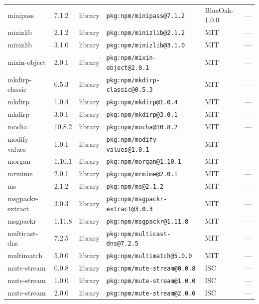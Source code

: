 \documentclass[11pt,a4paper]{article}
\begin{document}
\begin{longtable}{|p{4cm}|p{2cm}|p{1.6cm}|p{5cm}|p{1.5cm}|p{3.5cm}|}
\raggedright minipass & 7.1.2 & library & \small\texttt{pkg:npm/minipass@7.1.2} & BlueOak-1.0.0 & \small — \\
\raggedright minizlib & 2.1.2 & library & \small\texttt{pkg:npm/minizlib@2.1.2} & MIT & \small — \\
\raggedright minizlib & 3.1.0 & library & \small\texttt{pkg:npm/minizlib@3.1.0} & MIT & \small — \\
\raggedright mixin-object & 2.0.1 & library & \small\texttt{pkg:npm/mixin-object@2.0.1} & MIT & \small — \\
\raggedright mkdirp-classic & 0.5.3 & library & \small\texttt{pkg:npm/mkdirp-classic@0.5.3} & MIT & \small — \\
\raggedright mkdirp & 1.0.4 & library & \small\texttt{pkg:npm/mkdirp@1.0.4} & MIT & \small — \\
\raggedright mkdirp & 3.0.1 & library & \small\texttt{pkg:npm/mkdirp@3.0.1} & MIT & \small — \\
\raggedright mocha & 10.8.2 & library & \small\texttt{pkg:npm/mocha@10.8.2} & MIT & \small — \\
\raggedright modify-values & 1.0.1 & library & \small\texttt{pkg:npm/modify-values@1.0.1} & MIT & \small — \\
\raggedright morgan & 1.10.1 & library & \small\texttt{pkg:npm/morgan@1.10.1} & MIT & \small — \\
\raggedright mrmime & 2.0.1 & library & \small\texttt{pkg:npm/mrmime@2.0.1} & MIT & \small — \\
\raggedright ms & 2.1.2 & library & \small\texttt{pkg:npm/ms@2.1.2} & MIT & \small — \\
\raggedright msgpackr-extract & 3.0.3 & library & \small\texttt{pkg:npm/msgpackr-extract@3.0.3} & MIT & \small — \\
\raggedright msgpackr & 1.11.8 & library & \small\texttt{pkg:npm/msgpackr@1.11.8} & MIT & \small — \\
\raggedright multicast-dns & 7.2.5 & library & \small\texttt{pkg:npm/multicast-dns@7.2.5} & MIT & \small — \\
\raggedright multimatch & 5.0.0 & library & \small\texttt{pkg:npm/multimatch@5.0.0} & MIT & \small — \\
\raggedright mute-stream & 0.0.8 & library & \small\texttt{pkg:npm/mute-stream@0.0.8} & ISC & \small — \\
\raggedright mute-stream & 1.0.0 & library & \small\texttt{pkg:npm/mute-stream@1.0.0} & ISC & \small — \\
\raggedright mute-stream & 2.0.0 & library & \small\texttt{pkg:npm/mute-stream@2.0.0} & ISC & \small — \\

\end{longtable}
\end{document}
